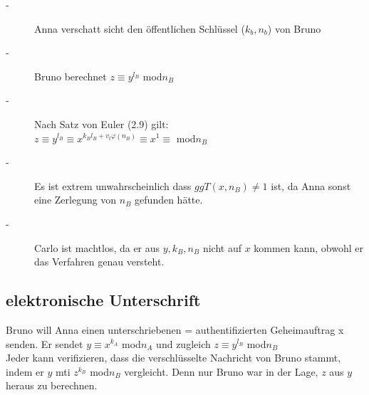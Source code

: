 \begin{enumerate}
	\begin{description}
		\item[-] Anna verschatt sicht den öffentlichen Schlüssel ($k_{b},n_{b}$) von Bruno
		\item[-] Bruno berechnet $z \equiv y^{l_{B}}$ mod$n_{B}$
		\item[-] Nach Satz von Euler (2.9) gilt: \\
				$z \equiv y^{l_{B}} \equiv x^{k_{B}l_{B} + v_{t} \varphi(n_{B})} \equiv x^{1} \equiv$ 						mod$n_{B}$
		\item[-] Es ist extrem unwahrscheinlich dass $ggT(x,n_{B}) \neq 1$ ist, da Anna sonst eine Zerlegung von 						$n_{B}$ gefunden hätte.
		\item[-] Carlo ist machtlos, da er aus $y, k_{B}, n_{B}$ nicht auf $x$ kommen kann, obwohl er das Verfahren 					genau versteht.
	\end{description}
\end{enumerate}
%
%
%
\subsection{elektronische Unterschrift}
Bruno will Anna einen unterschriebenen = authentifizierten Geheimauftrag x senden. Er sendet $y \equiv x^{k_{A}}$ mod$n_{A}$ und zugleich $z \equiv y^{l_{B}}$ mod$n_{B}$\\
Jeder kann verifizieren, dass die verschlüsselte Nachricht von Bruno stammt, indem er $y$ mti $z^{k_{B}}$ mod$n_{B}$ vergleicht. Denn nur Bruno war in der Lage, $z$ aus $y$ heraus zu berechnen.